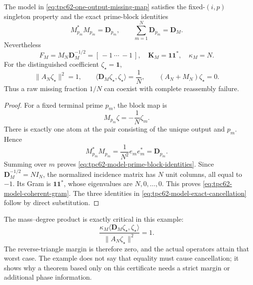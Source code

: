 \begin{proposition}
\label{prop:tpc62-exact-coherent-missing-model}
The model in \eqref{eq:tpc62-one-output-missing-map} satisfies the
fixed-\((i,p)\) singleton property and the exact prime-block identities
\begin{equation}
 M_{p_m}^*M_{p_m}=\mathbf D_{p_m},
 \qquad
 \sum_{m=1}^N\mathbf D_{p_m}=\mathbf D_M.
 \label{eq:tpc62-model-prime-block-identities}
\end{equation}
Nevertheless
\begin{equation}
 \boxed{
 F_M=M_N\mathbf D_M^{-1/2}
      =[\,-1\ \cdots\ -1\,],
 \quad
 \mathbf K_M=\boldsymbol 1\boldsymbol 1^*,
 \quad
 \kappa_M=N.}
 \label{eq:tpc62-model-coherent-gram}
\end{equation}
For the distinguished coefficient
\(\zeta_\star=\boldsymbol 1\),
\begin{equation}
 \|A_N\zeta_\star\|^2=1,
 \qquad
 \langle\mathbf D_M\zeta_\star,\zeta_\star\rangle=\frac1N,
 \qquad
 (A_N+M_N)\zeta_\star=0.
 \label{eq:tpc62-model-exact-cancellation}
\end{equation}
Thus a raw missing fraction \(1/N\) can coexist with complete reassembly
failure.
\end{proposition}

\begin{proof}
For a fixed terminal prime \(p_m\), the block map is
\[
 M_{p_m}\zeta=-\frac1N\zeta_m.
\]
There is exactly one atom at the pair consisting of the unique output and
\(p_m\).  Hence
\[
 M_{p_m}^*M_{p_m}
 =\frac1{N^2}e_me_m^*
 =\mathbf D_{p_m}.
\]
Summing over \(m\) proves
\eqref{eq:tpc62-model-prime-block-identities}.  Since
\(\mathbf D_M^{-1/2}=NI_N\), the normalized incidence matrix has \(N\)
unit columns, all equal to \(-1\).  Its Gram is
\(\boldsymbol 1\boldsymbol 1^*\), whose eigenvalues are \(N,0,\ldots,0\).
This proves \eqref{eq:tpc62-model-coherent-gram}.  The three identities in
\eqref{eq:tpc62-model-exact-cancellation} follow by direct substitution.
\end{proof}

The mass--degree product is exactly critical in this example:
\begin{equation}
 \frac{\kappa_M
 \langle\mathbf D_M\zeta_\star,\zeta_\star\rangle}
 {\|A_N\zeta_\star\|^2}=1.
 \label{eq:tpc62-model-critical-product}
\end{equation}
The reverse-triangle margin is therefore zero, and the actual operators
attain that worst case.  The example does not say that equality must cause
cancellation; it shows why a theorem based only on this certificate needs
a strict margin or additional phase information.

